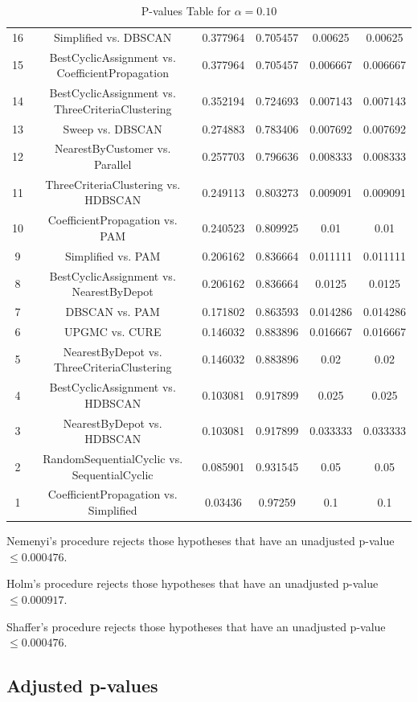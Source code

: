 \documentclass[a4paper,10pt]{article}
\begin{document}
\begin{landscape}
\begin{table}[!htp]
\begin{tabular}{cccccc}
16&Simplified vs. DBSCAN&0.377964&0.705457&0.00625&0.00625\\
15&BestCyclicAssignment vs. CoefficientPropagation&0.377964&0.705457&0.006667&0.006667\\
14&BestCyclicAssignment vs. ThreeCriteriaClustering&0.352194&0.724693&0.007143&0.007143\\
13&Sweep vs. DBSCAN&0.274883&0.783406&0.007692&0.007692\\
12&NearestByCustomer vs. Parallel&0.257703&0.796636&0.008333&0.008333\\
11&ThreeCriteriaClustering vs. HDBSCAN&0.249113&0.803273&0.009091&0.009091\\
10&CoefficientPropagation vs. PAM&0.240523&0.809925&0.01&0.01\\
9&Simplified vs. PAM&0.206162&0.836664&0.011111&0.011111\\
8&BestCyclicAssignment vs. NearestByDepot&0.206162&0.836664&0.0125&0.0125\\
7&DBSCAN vs. PAM&0.171802&0.863593&0.014286&0.014286\\
6&UPGMC vs. CURE&0.146032&0.883896&0.016667&0.016667\\
5&NearestByDepot vs. ThreeCriteriaClustering&0.146032&0.883896&0.02&0.02\\
4&BestCyclicAssignment vs. HDBSCAN&0.103081&0.917899&0.025&0.025\\
3&NearestByDepot vs. HDBSCAN&0.103081&0.917899&0.033333&0.033333\\
2&RandomSequentialCyclic vs. SequentialCyclic&0.085901&0.931545&0.05&0.05\\
1&CoefficientPropagation vs. Simplified&0.03436&0.97259&0.1&0.1\\
\hline
\end{tabular}
\caption{P-values Table for $\alpha=0.10$}
\end{table}Nemenyi's procedure rejects those hypotheses that have an unadjusted p-value $\le0.000476$.

Holm's procedure rejects those hypotheses that have an unadjusted p-value $\le0.000917$.

Shaffer's procedure rejects those hypotheses that have an unadjusted p-value $\le0.000476$.

\pagebreak

\subsection{Adjusted p-values}


\end{landscape}
\end{document}
